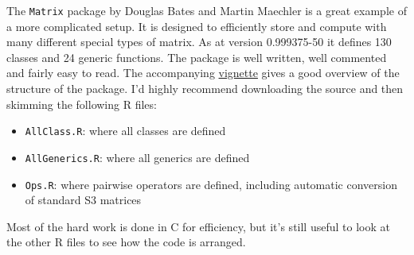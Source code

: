 The \texttt{Matrix} package by Douglas Bates and Martin Maechler is a
great example of a more complicated setup. It is designed to efficiently
store and compute with many different special types of matrix. As at
version 0.999375-50 it defines 130 classes and 24 generic functions. The
package is well written, well commented and fairly easy to read. The
accompanying
\href{http://cran.r-project.org/web/packages/Matrix/vignettes/Intro2Matrix.pdf}{vignette}
gives a good overview of the structure of the package. I'd highly
recommend downloading the source and then skimming the following R
files:

\begin{itemize}
\item
  \texttt{AllClass.R}: where all classes are defined
\item
  \texttt{AllGenerics.R}: where all generics are defined
\item
  \texttt{Ops.R}: where pairwise operators are defined, including
  automatic conversion of standard S3 matrices
\end{itemize}

Most of the hard work is done in C for efficiency, but it's still useful
to look at the other R files to see how the code is arranged.
